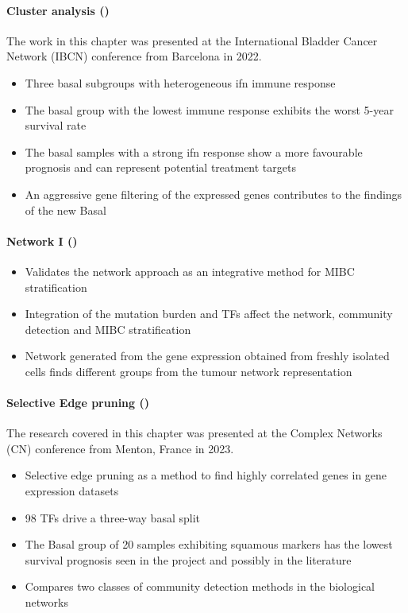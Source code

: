 \paragraph*{Cluster analysis ()}

The work in this chapter was presented at the International Bladder Cancer Network (IBCN) conference from Barcelona in 2022.


\begin{itemize}
    \item Three basal subgroups with heterogeneous \acrfull{ifn} immune response
    \item The basal group with the lowest immune response exhibits the worst 5-year survival rate
    \item The basal samples with a strong \acrshort{ifn} response show a more favourable prognosis and can represent potential treatment targets
    \item An aggressive gene filtering of the expressed genes contributes to the findings of the new Basal 
\end{itemize}

\paragraph*{Network I ()}

\begin{itemize}
    \item Validates the network approach as an integrative method for MIBC stratification
     \item Integration of the mutation burden and TFs affect the network, community detection and MIBC stratification
     \item Network generated from the gene expression obtained from freshly isolated cells finds different groups from the tumour network representation
\end{itemize}

\paragraph*{Selective Edge pruning ()}

The research covered in this chapter was presented at the Complex Networks (CN) conference from Menton, France in 2023.

\begin{itemize}
    \item Selective edge pruning as a method to find highly correlated genes in gene expression datasets 
    \item 98 TFs drive a three-way basal split
    \item The Basal group of 20 samples exhibiting squamous markers has the lowest survival prognosis seen in the project and possibly in the literature
    \item Compares two classes of community detection methods in the biological networks
\end{itemize}

